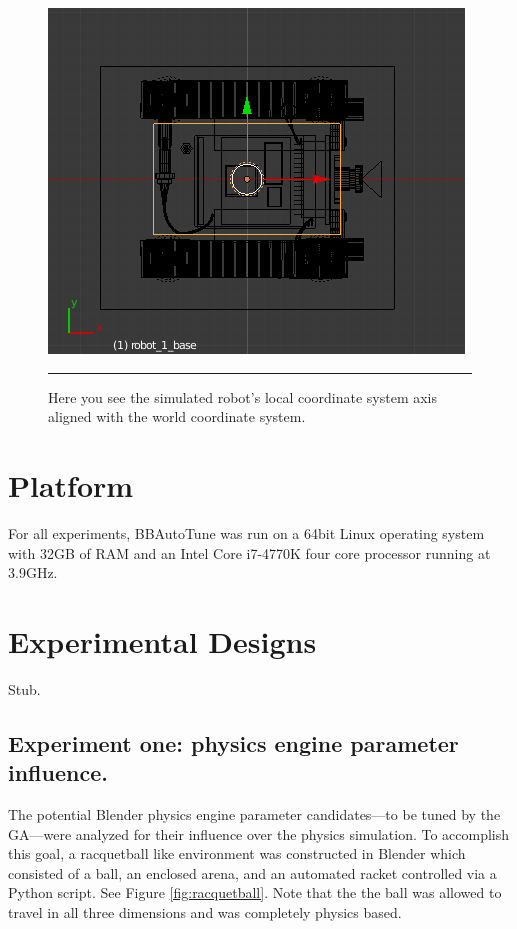 \begin{figure}[htbp]
\centering
\includegraphics[scale=0.5]{../Figures/Chapter4/simu_robot_aligned.png}
\rule{35em}{0.5pt}
\caption[Simulated Robot Axis Aligned]{Here you see the simulated robot's local coordinate system axis aligned with the world coordinate system.}
\label{fig:simu_robot_aligned}
\end{figure}

\section{Platform}

For all experiments, BBAutoTune was run on a 64bit Linux operating system with 32GB of RAM and an Intel Core i7-4770K four core processor running at 3.9GHz.

\section{Experimental Designs}

Stub.

\subsection[Experiment One]{Experiment one: physics engine parameter influence.}

The potential Blender physics engine parameter candidates---to be tuned by the GA---were analyzed for their influence over the physics simulation. To accomplish this goal, a racquetball like environment was constructed in Blender which consisted of a ball, an enclosed arena, and an automated racket controlled via a Python script. See Figure \ref{fig:racquetball}. Note that the the ball was allowed to travel in all three dimensions and was completely physics based.

